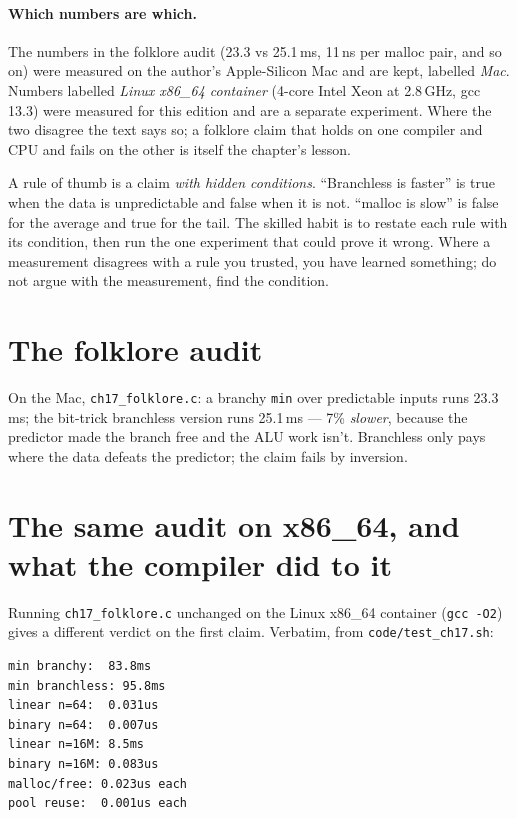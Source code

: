 \paragraph{Which numbers are which.}
The numbers in the folklore audit (23.3 vs 25.1\,ms, 11\,ns per
malloc pair, and so on) were measured on the author's Apple-Silicon
Mac and are kept, labelled \emph{Mac}. Numbers labelled
\emph{Linux x86\_64 container} (4-core Intel Xeon at 2.8\,GHz, gcc
13.3) were measured for this edition and are a separate experiment.
Where the two disagree the text says so; a folklore claim that holds
on one compiler and CPU and fails on the other is itself the
chapter's lesson.

\begin{principle}
A rule of thumb is a claim \emph{with hidden conditions}. ``Branchless
is faster'' is true when the data is unpredictable and false when it
is not. ``malloc is slow'' is false for the average and true for the
tail. The skilled habit is to restate each rule with its condition,
then run the one experiment that could prove it wrong. Where a
measurement disagrees with a rule you trusted, you have learned
something; do not argue with the measurement, find the condition.
\end{principle}

\section{The folklore audit}


\begin{example}
On the Mac, \texttt{ch17\_folklore.c}: a branchy \texttt{min} over predictable
inputs runs 23.3\,ms; the bit-trick branchless version runs
25.1\,ms --- 7\% \emph{slower}, because the predictor made the
branch free and the ALU work isn't. Branchless only pays where
the data defeats the predictor; the claim fails by inversion.
\end{example}



\section{The same audit on x86\_64, and what the compiler did to it}

Running \texttt{ch17\_folklore.c} unchanged on the Linux x86\_64
container (\texttt{gcc -O2}) gives a different verdict on the first
claim. Verbatim, from \texttt{code/test\_ch17.sh}:
\begin{verbatim}
min branchy:  83.8ms
min branchless: 95.8ms
linear n=64:  0.031us
binary n=64:  0.007us
linear n=16M: 8.5ms
binary n=16M: 0.083us
malloc/free: 0.023us each
pool reuse:  0.001us each
\end{verbatim}

